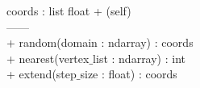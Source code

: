 {
	coords : list float
}
{
+ \dunder (self) \\

------\\
+ random(domain : ndarray) : coords \\
+ nearest(vertex$\_$list : ndarray) : int\\ %
+ extend(step$\_$size : float) : coords \\%
}
